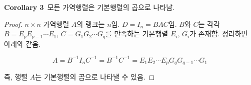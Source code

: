 \documentclass[10pt, a4paper]{article}
\begin{document}
\textbf{Corollary 3}\, 모든 가역행렬은 기본행렬의 곱으로 나타남.

\begin{proof}
$n \times n$ 가역행렬 $A$의 랭크는 $n$임. $D=I_n=BAC$임. $B$와 $C$는 각각 $B=E_{p}E_{p-1} \cdots E_{1}$, $C=G_{1}G_{2} \cdots G_{q}$를 만족하는 기본행렬 $E_{i},\,G_{i}$가 존재함. 정리하면 아래와 같음.

\[
A=B^{-1}I_{n}C^{-1}=B^{-1}C^{-1}=E_{1}E_{2} \cdots E_{p}G_{q}G_{q-1} \cdots G_{1}
\]

즉, 행렬 $A$는 기본행렬의 곱으로 나타낼 수 있음.
\end{proof}

\newpage
\end{document}
